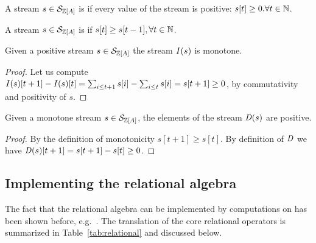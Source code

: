 \begin{definition}
A stream $s \in \mathcal{S}_{\mathbb{Z}[A]}$ is  if every value of the stream is positive:
$s[t] \geq 0 . \forall t \in \mathbb{N}$.
\end{definition}



\begin{definition}
A stream $s \in \mathcal{S}_{\mathbb{Z}[A]}$ is  if $s[t] \geq s[t-1], \forall t \in \mathbb{N}$.
\end{definition}

\begin{lemma}
Given a positive stream $s \in \mathcal{S}_{\mathbb{Z}[A]}$ the stream $\mathit{I}(s)$ is monotone.
\end{lemma}
\begin{proof}
  Let us compute $\mathit{I}(s)[t + 1] - \mathit{I}(s)[t] = \sum_{i \leq t+1}s[i] -
  \sum_{i \leq t}s[i] = s[t+1] \geq 0$, by commutativity and positivity of $s$.
\end{proof}

\begin{lemma}
Given a monotone stream $s \in \mathcal{S}_{\mathbb{Z}[A]}$, the
elements of the stream $\mathit{D}(s)$ are positive.
\end{lemma}
\begin{proof}
  By the definition of monotonicity $s[t+1] \geq s[t]$.  By definition
  of $\mathit{D}$ we have $\mathit{D}(s)[t+1] = s[t+1] - s[t] \geq 0$.
\end{proof}

\subsection{Implementing the relational algebra}\label{sec:relational-operators}

The fact that the relational algebra can be implemented by computations
on \zrs has been shown before, e.g.~\cite{green-pods07}.  The translation
of the core relational operators is summarized in Table~\ref{tab:relational} and discussed below.

